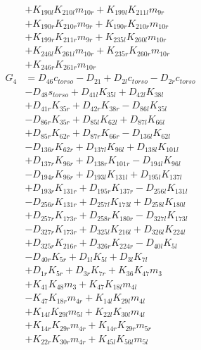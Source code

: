 \begin{multicols}{2}
\begin{align}
&+ K_{190l}K_{210l}m_{10r} + K_{199l}K_{211l}m_{9r}  \nonumber \\
&+ K_{190r}K_{210r}m_{9r} + K_{190r}K_{210r}m_{10r}  \nonumber \\
&+ K_{199r}K_{211r}m_{9r} + K_{235l}K_{260l}m_{10r}  \nonumber \\
&+ K_{246l}K_{261l}m_{10r} + K_{235r}K_{260r}m_{10r}  \nonumber \\
&+ K_{246r}K_{261r}m_{10r} \nonumber \\
G_{4} &= D_{46}c_{torso} - D_{21} + D_{2l}c_{torso} - D_{2r}c_{torso}  \nonumber \\
&- D_{48}s_{torso} + D_{41l}K_{35l} + D_{42l}K_{38l}  \nonumber \\
&+ D_{41r}K_{35r} + D_{42r}K_{38r} - D_{86l}K_{35l}  \nonumber \\
&- D_{86r}K_{35r} + D_{85l}K_{62l} + D_{87l}K_{66l}  \nonumber \\
&+ D_{85r}K_{62r} + D_{87r}K_{66r} - D_{136l}K_{62l}  \nonumber \\
&- D_{136r}K_{62r} + D_{137l}K_{96l} + D_{138l}K_{101l}  \nonumber \\
&+ D_{137r}K_{96r} + D_{138r}K_{101r} - D_{194l}K_{96l}  \nonumber \\
&- D_{194r}K_{96r} + D_{193l}K_{131l} + D_{195l}K_{137l}  \nonumber \\
&+ D_{193r}K_{131r} + D_{195r}K_{137r} - D_{256l}K_{131l}  \nonumber \\
&- D_{256r}K_{131r} + D_{257l}K_{173l} + D_{258l}K_{180l}  \nonumber \\
&+ D_{257r}K_{173r} + D_{258r}K_{180r} - D_{327l}K_{173l}  \nonumber \\
&- D_{327r}K_{173r} + D_{325l}K_{216l} + D_{326l}K_{224l}  \nonumber \\
&+ D_{325r}K_{216r} + D_{326r}K_{224r} - D_{40l}K_{5l}  \nonumber \\
&- D_{40r}K_{5r} + D_{1l}K_{5l} + D_{3l}K_{7l}  \nonumber \\
&+ D_{1r}K_{5r} + D_{3r}K_{7r} + K_{36}K_{47}m_3  \nonumber \\
&+ K_{41}K_{48}m_3 + K_{47}K_{18l}m_{4l}  \nonumber \\
&- K_{47}K_{18r}m_{4r} + K_{14l}K_{29l}m_{4l}  \nonumber \\
&+ K_{14l}K_{29l}m_{5l} + K_{22l}K_{30l}m_{4l}  \nonumber \\
&+ K_{14r}K_{29r}m_{4r} + K_{14r}K_{29r}m_{5r}  \nonumber \\
&+ K_{22r}K_{30r}m_{4r} + K_{45l}K_{56l}m_{5l}  \nonumber \\

\end{align}
\end{multicols}
